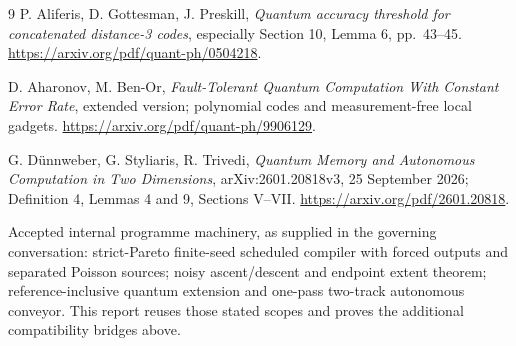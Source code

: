 \documentclass[11pt]{article}
\begin{document}
\begin{thebibliography}{9}
P. Aliferis, D. Gottesman, J. Preskill,
\emph{Quantum accuracy threshold for concatenated distance-3 codes},
especially Section 10, Lemma 6, pp.\ 43--45.
\url{https://arxiv.org/pdf/quant-ph/0504218}.

D. Aharonov, M. Ben-Or,
\emph{Fault-Tolerant Quantum Computation With Constant Error Rate},
extended version; polynomial codes and measurement-free local gadgets.
\url{https://arxiv.org/pdf/quant-ph/9906129}.

G. D\"unnweber, G. Styliaris, R. Trivedi,
\emph{Quantum Memory and Autonomous Computation in Two Dimensions},
arXiv:2601.20818v3, 25 September 2026; Definition 4,
Lemmas 4 and 9, Sections V--VII.
\url{https://arxiv.org/pdf/2601.20818}.

Accepted internal programme machinery, as supplied in the governing
conversation: strict-Pareto finite-seed scheduled compiler with forced
outputs and separated Poisson sources; noisy ascent/descent and endpoint
extent theorem; reference-inclusive quantum extension and one-pass
two-track autonomous conveyor. This report reuses those stated scopes
and proves the additional compatibility bridges above.
\end{thebibliography}
\end{document}
